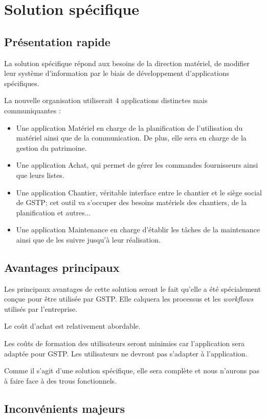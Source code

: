 \section{Solution spécifique}

\subsection{Présentation rapide}

La solution spécifique répond aux besoins de la direction matériel, de modifier
leur système d'information par le biais de développement d'applications spécifiques.

La nouvelle organisation utiliserait 4 applications distinctes mais communiquantes : 
\begin{itemize}
\item Une application Matériel en charge de la planification de l'utilisation du 
matériel ainsi que de la communication. De plus, elle sera en charge de la gestion du 
patrimoine.
\item Une application Achat, qui permet de gérer les commandes fournisseurs ainsi que
leurs listes.
\item Une application Chantier, véritable interface entre le chantier et le siège 
social de GSTP; cet outil va s'occuper des besoins matériels des chantiers, de la planification et autres...
\item Une application Maintenance en charge d'établir les tâches de la maintenance ainsi que de les suivre 
jusqu'à leur réalisation.
\end{itemize}

\subsection{Avantages principaux}

Les principaux avantages de cette solution seront le fait qu'elle a été spécialement
conçue pour être utilisée par GSTP. Elle calquera les processus et les {\sl workflows}
utilisés par l'entreprise.

Le coût d'achat est relativement abordable.

Les coûts de formation des utilisateurs seront minimies car l'application sera 
adaptée pour GSTP. Les utilisateurs ne devront pas s'adapter à l'application.

Comme il s'agit d'une solution spécifique, elle sera complète et nous n'aurons pas à faire face
à des trous fonctionnels.

\subsection{Inconvénients majeurs}

